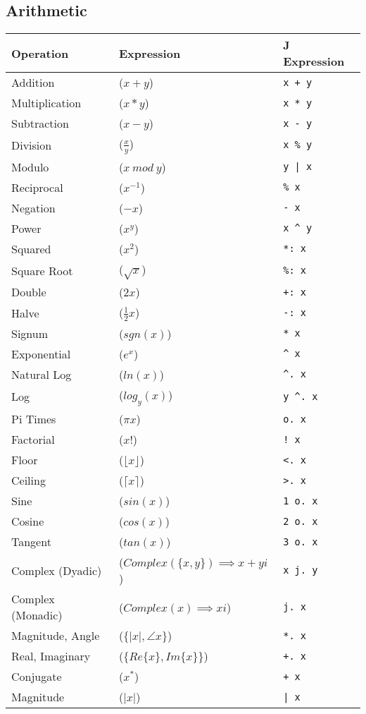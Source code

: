 \documentclass[12pt]{article}
\begin{document}
\subsection{Arithmetic}
\begin{tabular}{|l|l|l|}
\hline
Operation & Expression & J Expression \\
\hline
Addition & ($x + y$) & \texttt{x + y} \\
Multiplication & ($x * y$) & \texttt{x * y} \\ 
Subtraction & ($x - y$) & \texttt{x - y} \\
Division & ($\frac{x}{y}$) & \texttt{x \% y} \\
Modulo & ($x\ mod\ y$) & \texttt{y | x} \\
Reciprocal & ($x^{-1}$) & \texttt{\% x} \\
Negation & ($-x$) & \texttt{- x} \\
Power & ($x^y$) & \texttt{x \^{} y} \\
Squared & ($x^2$) & \texttt{*: x} \\
Square Root & ($\sqrt{x}$) & \texttt{\%: x} \\
Double & ($2x$) & \texttt{+: x} \\
Halve  &($\frac{1}{2}x$) & \texttt{-: x} \\
Signum & ($sgn(x)$) & \texttt{* x} \\
Exponential & ($e^{x}$) & \texttt{\^{} x} \\
Natural Log & ($ln(x)$) & \texttt{\^{}. x} \\
Log & ($log_y(x)$) & \texttt{y \^{}. x} \\
Pi Times & ($\pi x$) & \texttt{o. x} \\
Factorial & ($x!$) & \texttt{! x} \\
Floor & ($\lfloor x \rfloor$) & \texttt{<. x} \\
Ceiling & ($\lceil x \rceil$) & \texttt{>. x} \\
Sine  &($sin(x)$) & \texttt{1 o. x} \\
Cosine & ($cos(x)$) & \texttt{2 o. x} \\
Tangent & ($tan(x)$) & \texttt{3 o. x} \\
\hline
Complex (Dyadic) & ($Complex(\{x, y\}) \implies x + yi$) & \texttt{x j. y} \\
Complex (Monadic) & ($Complex(x) \implies xi$) & \texttt{j. x} \\
Magnitude, Angle & ($\{|x|, \angle x\}$) & \texttt{*. x} \\
Real, Imaginary & ($\{Re\{x\}, Im\{x\}\}$) & \texttt{+. x} \\
Conjugate & ($x^{*}$) & \texttt{+ x} \\
Magnitude & ($|x|$) & \texttt{| x} \\
\hline
\end{tabular}
\end{document}
